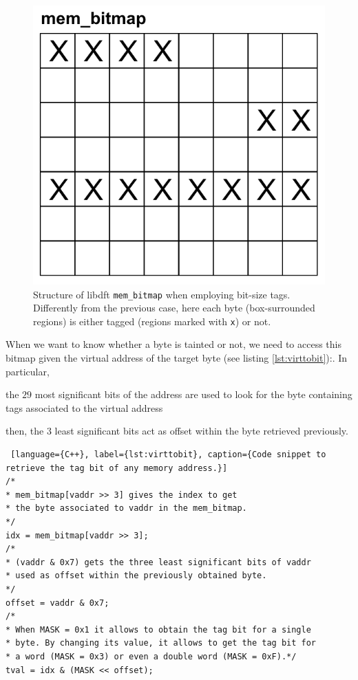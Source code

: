 \documentclass[LaM,binding=0.6cm]{sapthesis}
\begin{document}
\begin{itemize}
\begin{figure}[h!]
\centering
\includegraphics[scale=.6]{images/techn11}
\caption{Structure of libdft \texttt{mem\_bitmap} when employing bit-size tags. Differently from the previous case, here each byte (box-surrounded regions) is either tagged (regions marked with \texttt{x}) or not.}
\end{figure}

When we want to know whether a byte is tainted or not, we need to access this bitmap given the virtual address of the target byte (see listing \ref{lst:virttobit}):. In particular, 
\begin{enumerate*}[label=\roman*),itemjoin={,\quad}]
\item the $29$ most significant bits of the address are used to look for the byte containing tags associated to the virtual address
\item then, the $3$ least significant bits act as offset within the byte retrieved previously.
\end{enumerate*}
\begin{lstlisting} [language={C++}, label={lst:virttobit}, caption={Code snippet to retrieve the tag bit of any memory address.}]
/*
* mem_bitmap[vaddr >> 3] gives the index to get
* the byte associated to vaddr in the mem_bitmap.
*/
idx = mem_bitmap[vaddr >> 3];
/*
* (vaddr & 0x7) gets the three least significant bits of vaddr
* used as offset within the previously obtained byte.
*/
offset = vaddr & 0x7;
/*
* When MASK = 0x1 it allows to obtain the tag bit for a single
* byte. By changing its value, it allows to get the tag bit for
* a word (MASK = 0x3) or even a double word (MASK = 0xF).*/
tval = idx & (MASK << offset);
\end{lstlisting}
\end{itemize}
\end{document}
